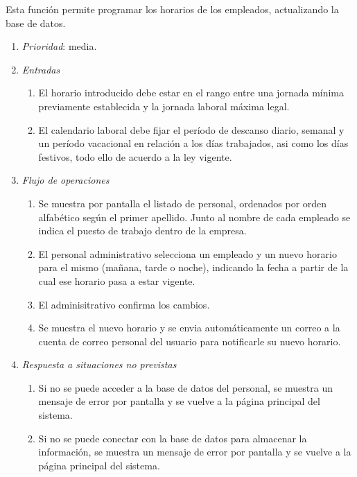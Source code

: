 

	Esta función permite programar los horarios de los empleados, actualizando la base de datos.

	\begin{enumerate}
		\item \textit{Prioridad}: media.
		\item \textit{Entradas}
		\begin{enumerate}
			\item El horario introducido debe estar en el rango entre una jornada mínima previamente establecida y la jornada laboral máxima legal.
			\item El calendario laboral debe fijar el período de descanso diario, semanal y un período vacacional en relación a los días trabajados, asi como los días festivos, todo ello de acuerdo a la ley vigente.
		\end{enumerate}
		\item \textit{Flujo de operaciones}
		\begin{enumerate}
			\item Se muestra por pantalla el listado de personal, ordenados por orden alfabético según el primer apellido. Junto al nombre de cada empleado se indica el puesto de trabajo dentro de la empresa.
			\item El personal administrativo selecciona un empleado y un nuevo horario para el mismo (mañana, tarde o noche), indicando la fecha a partir de la cual ese horario pasa a estar vigente. 
			\item El adminisitrativo confirma los cambios.
			\item Se muestra el nuevo horario y se envia automáticamente un correo a la cuenta de correo personal del usuario para notificarle su nuevo horario.
		\end{enumerate}
		\item \textit{Respuesta a situaciones no previstas}
		\begin{enumerate}
			\item Si no se puede acceder a la base de datos del personal, se muestra un mensaje de error por pantalla y se vuelve a la página principal del sistema.
			\item Si no se puede conectar con la base de datos para almacenar la información, se muestra un mensaje de error por pantalla y se vuelve a la página principal del sistema.
		\end{enumerate}
	\end{enumerate}
